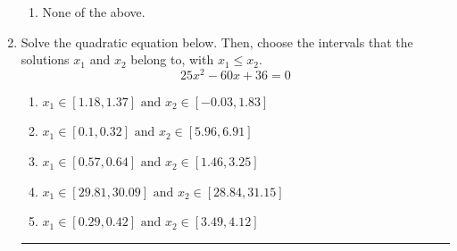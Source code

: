 \documentclass[14pt]{extbook}
\newcommand{\litem}[1]{\item#1\hspace*{-1cm}\rule{\textwidth}{0.4pt}}
\begin{document}
\begin{enumerate}
{\begin{enumerate}[label=\Alph*.]
\item None of the above.
\end{enumerate} }
\litem{
Solve the quadratic equation below. Then, choose the intervals that the solutions $x_1$ and $x_2$ belong to, with $x_1 \leq x_2$.\[ 25x^{2} -60 x + 36 = 0 \]\begin{enumerate}[label=\Alph*.]
\item \( x_1 \in [1.18, 1.37] \text{ and } x_2 \in [-0.03, 1.83] \)
\item \( x_1 \in [0.1, 0.32] \text{ and } x_2 \in [5.96, 6.91] \)
\item \( x_1 \in [0.57, 0.64] \text{ and } x_2 \in [1.46, 3.25] \)
\item \( x_1 \in [29.81, 30.09] \text{ and } x_2 \in [28.84, 31.15] \)
\item \( x_1 \in [0.29, 0.42] \text{ and } x_2 \in [3.49, 4.12] \)

\end{enumerate} }
\end{enumerate}
\end{document}
